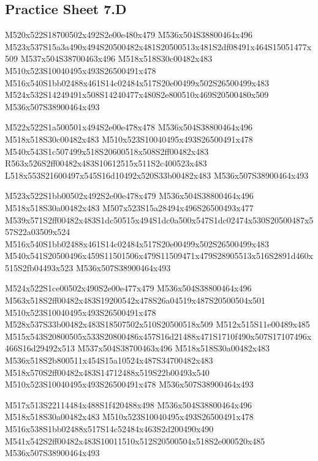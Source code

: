 \documentclass{article}
\begin{document}
\subsection{Practice Sheet 7.D}

\begin{multicols}{5}
\begin{center}

M520x522S18700502x492S2e00e480x479 %
M536x504S38800464x496 %
M523x537S15a3a490x494S20500482x481S20500513x481S2df08491x464S15051477x509 %
M537x504S38700463x496 %
M518x518S30c00482x483 %
M510x523S10040495x493S26500491x478 %
M516x540S1bb02488x461S14c02484x517S20e00499x502S26500499x483 %
M524x532S14249491x508S14240477x480S2e800510x469S20500480x509 %
M536x507S38900464x493 %
\vfil
\columnbreak

M522x522S1a500501x494S2e00e478x478 %
M536x504S38800464x496 %
M518x518S30c00482x483 %
M510x523S10040495x493S26500491x478 %
M540x543S1c507499x518S20600518x508S2ff00482x483 %
R563x526S2ff00482x483S10612515x511S2c400523x483 %
L518x553S21600497x545S16d10492x520S33b00482x483 %
M536x507S38900464x493 %
\vfil
\columnbreak

M523x522S1bb00502x492S2e00e478x479 %
M536x504S38800464x496 %
M518x518S30a00482x483 %
M507x523S15a28494x496S26500493x477 %
M539x571S2ff00482x483S1dc50515x494S1dc0a500x547S1dc02474x530S20500487x557S22a03509x524 %
M516x540S1bb02488x461S14c02484x517S20e00499x502S26500499x483 %
M540x541S20500496x459S11501506x479S11509471x479S28905513x516S2891d460x515S2fb04493x523 %
M536x507S38900464x493 %
\vfil
\columnbreak

M524x522S1ce00502x490S2e00e477x479 %
M536x504S38800464x496 %
M563x518S2ff00482x483S19200542x478S26a04519x487S20500504x501 %
M510x523S10040495x493S26500491x478 %
M528x537S33b00482x483S18507502x510S20500518x509 %
M512x515S11e00489x485 %
M515x543S20800505x533S20800486x457S16d21488x471S1710f490x507S17107496x466S16d29492x513 %
M537x504S38700463x496 %
M518x518S30a00482x483 %
M536x518S2b800511x454S15a10524x487S34700482x483 %
M518x570S2ff00482x483S14712488x519S22b00493x540 %
M510x523S10040495x493S26500491x478 %
M536x507S38900464x493 %
\vfil
\columnbreak

M517x513S22114484x488S1f420488x498 %
M536x504S38800464x496 %
M518x518S30a00482x483 %
M510x523S10040495x493S26500491x478 %
M516x538S1bb02488x517S14c52484x463S2d200490x490 %
M541x542S2ff00482x483S10011510x512S20500504x518S2e000520x485 %
M536x507S38900464x493 %
\vfil

\end{center}
\end{multicols}
\end{document}
